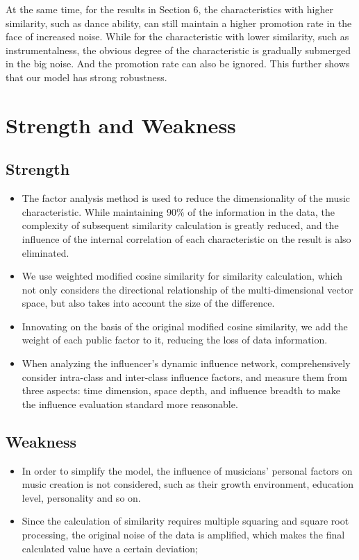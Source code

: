 \documentclass{mcmthesis}
\begin{document}
At the same time, for the results in Section 6, the characteristics with higher similarity, such as dance ability, can still maintain a higher promotion rate in the face of increased noise. While for the characteristic with lower similarity, such as instrumentalness, the obvious degree of the characteristic is gradually submerged in the big noise. And the promotion rate can also be ignored. This further shows that our model has strong robustness.

\section{Strength and Weakness}
\subsection{Strength}
\begin{itemize}
	\item The factor analysis method is used to reduce the dimensionality of the music characteristic. While maintaining 90$\%$ of the information in the data, the complexity of subsequent similarity calculation is greatly reduced, and the influence of the internal correlation of each characteristic on the result is also eliminated.
	\item We use weighted modified cosine similarity for similarity calculation, which not only considers the directional relationship of the multi-dimensional vector space, but also takes into account the size of the difference.
	\item Innovating on the basis of the original modified cosine similarity, we add the weight of each public factor to it, reducing the loss of data information.
	\item When analyzing the influencer's dynamic influence network, comprehensively consider intra-class and inter-class influence factors, and measure them from three aspects: time dimension, space depth, and influence breadth to make the influence evaluation standard more reasonable.
\end{itemize}
\subsection{Weakness}
\begin{itemize}
	\item In order to simplify the model, the influence of musicians' personal factors on music creation is not considered, such as their growth environment, education level, personality and so on. 
	\item Since the calculation of similarity requires multiple squaring and square root processing, the original noise of the data is amplified, which makes the final calculated value have a certain deviation;
\end{itemize}
\end{document}
